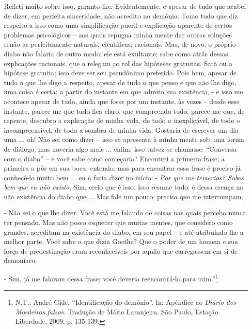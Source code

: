 Refleti muito sobre isso, garanto-lhe. Evidentemente, e apesar de tudo
que acabei de dizer, em perfeita sinceridade, não acredito no demônio.
Tomo tudo que diz respeito a isso como uma simplificação pueril e
explicação aparente de certos problemas psicológicos -- aos quais
repugna minha mente dar outras soluções senão as perfeitamente naturais,
científicas, racionais. Mas, de novo, o próprio diabo não falaria de
outro modo; ele está exultante; sabe como atrás dessas explicações
racionais, que o relegam ao rol das hipóteses gratuitas. Satã ou a
hipótese gratuita; isso deve ser seu pseudônimo preferido. Pois bem,
apesar de tudo o que lhe digo a respeito, apesar de tudo o que penso e
que não lhe digo, uma coisa é certa: a partir do instante em que admito
sua existência, - e isso me acontece apesar de tudo, ainda que fosse por
um instante, às vezes -- desde esse instante, parece-me que tudo fica
claro, que compreendo tudo; parece-me que, de repente, descubro a
explicação de minha vida, de todo o inexplicável, de todo o
incompreensível, de toda a sombra de minha vida. Gostaria de escrever um
dia uma ... oh! Não sei como dizer -- isso se apresenta à minha mente
sob uma forma de diálogo, mas haveria algo mais ... enfim, isso talvez
se chamasse: ``Conversa com o diabo'' -- e você sabe como começaria?
Encontrei a primeira frase; a primeira a pôr em sua boca, entenda; mas
para encontrar essa frase é preciso já conhecê-lo muito bem ... eu o
faria dizer no início: - \emph{Por que me temerias? Sabes bem que eu não
existo}. Sim, creio que é isso. Isso resume tudo: é dessa crença na não
existência do diabo que ... Mas fale um pouco: preciso que me
interrompam.

- Não sei o que lhe dizer. Você está me falando de coisas nas quais
percebo nunca ter pensado. Mas não posso esquecer que muitas mentes, que
considero como grandes, acreditam na existência do diabo, em seu papel
-- e até atribuindo-lhe a melhor parte. Você sabe o que dizia Goethe?
Que o poder de um homem e sua força de predestinação eram reconhecíveis
por aquilo que carregassem em si de demoníaco.

- Sim, já me falaram dessa frase; você deveria reencontrá-la para
mim.''\footnote{N.T.: André Gide, ``Identificação do demônio''. In:
  Apêndice ao \emph{Diário dos Moedeiros falsos}. Tradução de Mário
  Laranjeira. São Paulo, Estação Liberdade, 2009, p. 135-139.}

